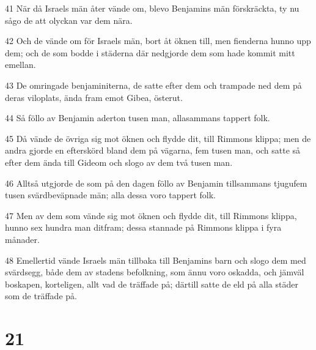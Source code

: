 \par 41 När då Israels män åter vände om, blevo Benjamins män förskräckta, ty nu sågo de att olyckan var dem nära.
\par 42 Och de vände om för Israels män, bort åt öknen till, men fienderna hunno upp dem; och de som bodde i städerna där nedgjorde dem som hade kommit mitt emellan.
\par 43 De omringade benjaminiterna, de satte efter dem och trampade ned dem på deras viloplats, ända fram emot Gibea, österut.
\par 44 Så föllo av Benjamin aderton tusen man, allasammans tappert folk.
\par 45 Då vände de övriga sig mot öknen och flydde dit, till Rimmons klippa; men de andra gjorde en efterskörd bland dem på vägarna, fem tusen man, och satte så efter dem ända till Gideom och slogo av dem två tusen man.
\par 46 Alltså utgjorde de som på den dagen föllo av Benjamin tillsammans tjugufem tusen svärdbeväpnade män; alla dessa voro tappert folk.
\par 47 Men av dem som vände sig mot öknen och flydde dit, till Rimmons klippa, hunno sex hundra man ditfram; dessa stannade på Rimmons klippa i fyra månader.
\par 48 Emellertid vände Israels män tillbaka till Benjamins barn och slogo dem med svärdsegg, både dem av stadens befolkning, som ännu voro oskadda, och jämväl boskapen, korteligen, allt vad de träffade på; därtill satte de eld på alla städer som de träffade på.

\chapter{21}

